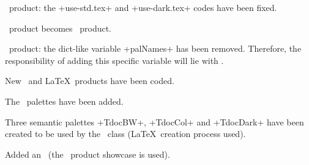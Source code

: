 \documentclass{tutodoc}
\begin{document}
\small

\begin{tdocfix}
    \item \lua\ product: the +use-std.tex+ and +use-dark.tex+ codes have been fixed.
\end{tdocfix}




\begin{tdocbreak}
    \item \LUADRAW\ product becomes \lua\ product.


    \item \lua\ product: the dict-like variable +palNames+ has been removed. Therefore, the responsibility of adding this specific variable will lie with \LUADRAW.
\end{tdocbreak}




\begin{tdocnew}
    \item New \css\ and \LaTeX\ products have been coded.


    \item The \palettable\ palettes have been added.


    \item Three semantic palettes +TdocBW+, +TdocCol+ and +TdocDark+ have been created to be used by the \tutodoc\ class (\LaTeX\ creation process used).


    \item Added an \thisdemo\ (the \css\ product showcase is used).
\end{tdocnew}


\end{document}
